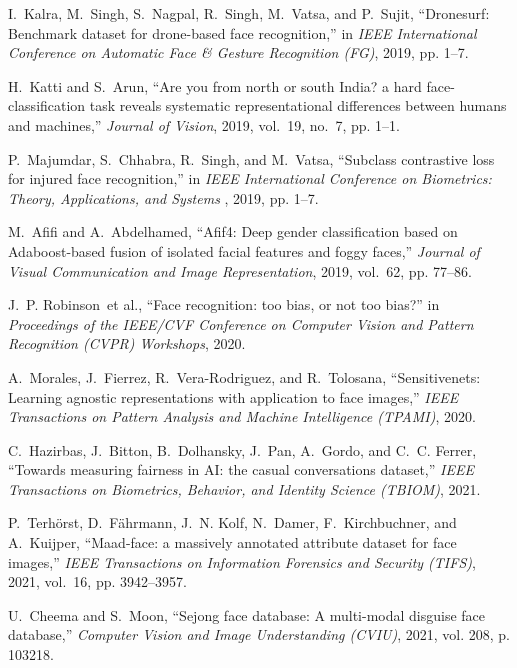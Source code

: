 \documentclass[journal]{IEEEtran}
\begin{document}
\begin{thebibliography}{100}
I.~Kalra, M.~Singh, S.~Nagpal, R.~Singh, M.~Vatsa, and P.~Sujit, ``Dronesurf: Benchmark dataset for drone-based face recognition,'' in \emph{IEEE
International Conference on Automatic Face \& Gesture Recognition (FG)}, 2019, pp. 1--7.

H.~Katti and S.~Arun, ``Are you from north or south India? a hard face-classification task reveals systematic representational differences between humans and machines,'' \emph{Journal of Vision}, 2019, vol.~19, no.~7, pp.
1--1.

P.~Majumdar, S.~Chhabra, R.~Singh, and M.~Vatsa, ``Subclass contrastive loss for injured face recognition,'' in \emph{IEEE International Conference on Biometrics: Theory, Applications, and Systems }, 2019, pp. 1--7.

M.~Afifi and A.~Abdelhamed, ``Afif4: Deep gender classification based on
Adaboost-based fusion of isolated facial features and foggy faces,''
\emph{Journal of Visual Communication and Image Representation}, 2019, vol.~62, pp.
77--86.

J.~P. Robinson~et al., ``Face recognition: too bias, or not too bias?'' in \emph{Proceedings of the IEEE/CVF Conference on Computer Vision and Pattern Recognition (CVPR) Workshops}, 2020.

A.~Morales, J.~Fierrez, R.~Vera-Rodriguez, and R.~Tolosana, ``Sensitivenets: Learning agnostic representations with application to face images,''
\emph{IEEE Transactions on Pattern Analysis and Machine Intelligence (TPAMI)}, 2020.

C.~Hazirbas, J.~Bitton, B.~Dolhansky, J.~Pan, A.~Gordo, and C.~C. Ferrer, ``Towards measuring fairness in AI: the casual conversations dataset,'' \emph{IEEE Transactions on Biometrics, Behavior, and Identity Science (TBIOM)}, 2021.

P.~Terh{\"o}rst, D.~F{\"a}hrmann, J.~N. Kolf, N.~Damer, F.~Kirchbuchner, and A.~Kuijper, ``Maad-face: a massively annotated attribute dataset for face images,'' \emph{IEEE Transactions on Information Forensics and Security (TIFS)}, 2021, vol.~16, pp. 3942--3957.

U.~Cheema and S.~Moon, ``Sejong face database: A multi-modal disguise face database,'' \emph{Computer Vision and Image Understanding (CVIU)}, 2021, vol. 208, p.
103218.


\end{thebibliography}
\end{document}
